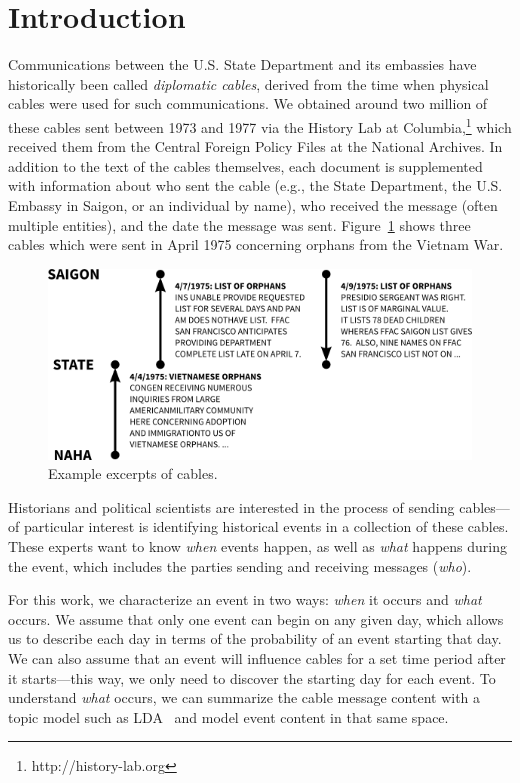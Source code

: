 \section{Introduction}

Communications between the U.S. State Department and its embassies have historically been called \emph{diplomatic cables}, derived from the time when physical cables were used for such communications.
We obtained around two million of these cables sent between 1973 and 1977 via the History Lab at Columbia,\footnote{http://history-lab.org} which received them from the Central Foreign Policy Files at the National Archives.  In addition to the text of the cables themselves, each document is supplemented with information about who sent the cable (e.g., the State Department, the U.S. Embassy in Saigon, or an individual by name), who received the message (often multiple entities), and the date the message was sent.
Figure~\ref{fig:cables_example} shows three cables which were sent in April 1975 concerning orphans from the Vietnam War.


\begin{figure}[ht]
\centering
\includegraphics[width=\textwidth]{fig/cables_orphan_example.png}
\caption{Example excerpts of cables.}
\label{fig:cables_example}
\end{figure}

Historians and political scientists are interested in the process of sending cables---of particular interest is identifying historical events in a collection of these cables.  These experts want to know \emph{when} events happen, as well as \emph{what} happens during the event, which includes the parties sending and receiving messages (\emph{who}). 

For this work, we characterize an event in two ways: \emph{when} it occurs and \emph{what} occurs.  We assume that only one event can begin on any given day, which allows us to describe each day in terms of the probability of an event starting that day.  We can also assume that an event will influence cables for a set time period after it starts---this way, we only need to discover the starting day for each event.  
To understand \emph{what} occurs, we can summarize the cable message content with a topic model such as LDA~\citep{Blei:2003} and model event content in that same space.



